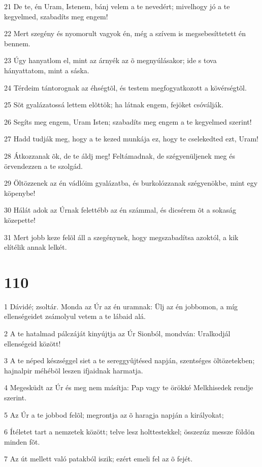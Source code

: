 \par 21 De te, én Uram, Istenem, bánj velem a te nevedért; mivelhogy jó a te kegyelmed, szabadíts meg engem!
\par 22 Mert szegény és nyomorult vagyok én, még a szívem is megsebesíttetett én bennem.
\par 23 Úgy hanyatlom el, mint az árnyék az õ megnyúlásakor; ide s tova hányattatom, mint a sáska.
\par 24 Térdeim tántorognak az éhségtõl, és testem megfogyatkozott a kövérségtõl.
\par 25 Sõt gyalázatossá lettem elõttök; ha látnak engem, fejöket csóválják.
\par 26 Segíts meg engem, Uram Isten; szabadíts meg engem a te kegyelmed szerint!
\par 27 Hadd tudják meg, hogy a te kezed munkája ez, hogy te cselekedted ezt, Uram!
\par 28 Átkozzanak õk, de te áldj meg! Feltámadnak, de szégyenüljenek meg és örvendezzen a te szolgád.
\par 29 Öltözzenek az én vádlóim gyalázatba, és burkolózzanak szégyenökbe, mint egy köpenybe!
\par 30 Hálát adok az Úrnak felettébb az én számmal, és dicsérem õt a sokaság közepette!
\par 31 Mert jobb keze felõl áll a szegénynek, hogy megszabadítsa azoktól, a kik elítélik annak lelkét.

\chapter{110}

\par 1 Dávidé; zsoltár. Monda az Úr az én uramnak: Ülj az én jobbomon, a míg ellenségeidet zsámolyul vetem a te lábaid alá.
\par 2 A te hatalmad pálczáját kinyújtja az Úr Sionból, mondván: Uralkodjál ellenségeid között!
\par 3 A te néped készséggel siet a te sereggyûjtésed napján, szentséges öltözetekben; hajnalpir méhébõl leszen ifjaidnak harmatja.
\par 4 Megesküdt az Úr és meg nem másítja: Pap vagy te örökké Melkhisedek rendje szerint.
\par 5 Az Úr a te jobbod felõl; megrontja az õ haragja napján a királyokat;
\par 6 Ítéletet tart a nemzetek között; telve lesz holttestekkel; összezúz messze földön minden fõt.
\par 7 Az út mellett való patakból iszik; ezért emeli fel az õ fejét.

